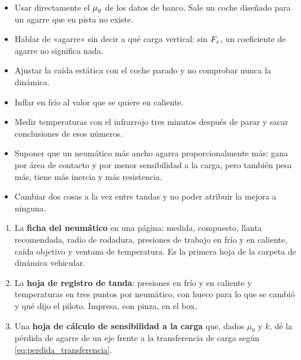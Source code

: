 \begin{ojo}
\begin{itemize}
  \item Usar directamente el $\mu_y$ de los datos de banco. Sale un coche
        diseñado para un agarre que en pista no existe.
  \item Hablar de «agarre» sin decir a qué carga vertical: sin $F_z$, un
        coeficiente de agarre no significa nada.
  \item Ajustar la caída estática con el coche parado y no comprobar nunca la
        dinámica.
  \item Inflar en frío al valor que se quiere en caliente.
  \item Medir temperaturas con el infrarrojo tres minutos después de parar y
        sacar conclusiones de esos números.
  \item Suponer que un neumático más ancho agarra proporcionalmente más: gana
        por área de contacto y por menor sensibilidad a la carga, pero también
        pesa más, tiene más inercia y más resistencia.
  \item Cambiar dos cosas a la vez entre tandas y no poder atribuir la mejora a
        ninguna.
\end{itemize}
\end{ojo}

\begin{entregable}
\begin{enumerate}
  \item La \textbf{ficha del neumático} en una página: medida, compuesto, llanta
        recomendada, radio de rodadura, presiones de trabajo en frío y en
        caliente, caída objetivo y ventana de temperatura. Es la primera hoja de
        la carpeta de dinámica vehicular.
  \item La \textbf{hoja de registro de tanda}: presiones en frío y en caliente y
        temperaturas en tres puntos por neumático, con hueco para lo que se
        cambió y qué dijo el piloto. Impresa, con pinza, en el box.
  \item Una \textbf{hoja de cálculo de sensibilidad a la carga} que, dados
        $\mu_0$ y $k$, dé la pérdida de agarre de un eje frente a la
        transferencia de carga según \eqref{eq:perdida_transferencia}.
\end{enumerate}
\end{entregable}

